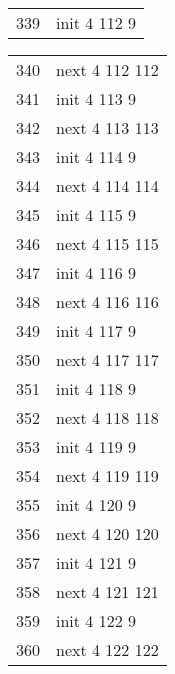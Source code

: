 \begin{center}
\begin{tabular}[h!]{>{\ttfamily\color{UniRed}}r >{\ttfamily}l }
                339 & init \color{UniGrey} 4 \color{UniRed} 112 9   \\
        \end{tabular}\quad
        \begin{tabular}[h!]{>{\ttfamily\color{UniRed}}r >{\ttfamily}l }
                340 & next \color{UniGrey} 4 \color{UniRed} 112 112 \\
                341 & init \color{UniGrey} 4 \color{UniRed} 113 9   \\
                342 & next \color{UniGrey} 4 \color{UniRed} 113 113 \\
                343 & init \color{UniGrey} 4 \color{UniRed} 114 9   \\
                344 & next \color{UniGrey} 4 \color{UniRed} 114 114 \\
                345 & init \color{UniGrey} 4 \color{UniRed} 115 9   \\
                346 & next \color{UniGrey} 4 \color{UniRed} 115 115 \\
                347 & init \color{UniGrey} 4 \color{UniRed} 116 9   \\
                348 & next \color{UniGrey} 4 \color{UniRed} 116 116 \\
                349 & init \color{UniGrey} 4 \color{UniRed} 117 9   \\
                350 & next \color{UniGrey} 4 \color{UniRed} 117 117 \\
                351 & init \color{UniGrey} 4 \color{UniRed} 118 9   \\
                352 & next \color{UniGrey} 4 \color{UniRed} 118 118 \\
                353 & init \color{UniGrey} 4 \color{UniRed} 119 9   \\
                354 & next \color{UniGrey} 4 \color{UniRed} 119 119 \\
                355 & init \color{UniGrey} 4 \color{UniRed} 120 9   \\
                356 & next \color{UniGrey} 4 \color{UniRed} 120 120 \\
                357 & init \color{UniGrey} 4 \color{UniRed} 121 9   \\
                358 & next \color{UniGrey} 4 \color{UniRed} 121 121 \\
                359 & init \color{UniGrey} 4 \color{UniRed} 122 9   \\
                360 & next \color{UniGrey} 4 \color{UniRed} 122 122 \\

\end{tabular}
\end{center}

